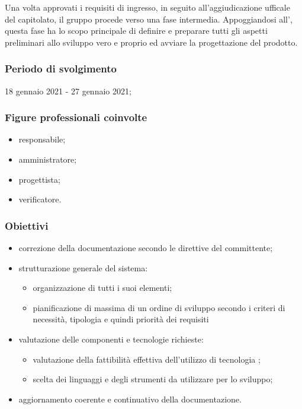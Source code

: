 Una volta approvati i requisiti di ingresso, in seguito all'aggiudicazione ufficale del capitolato, il gruppo procede verso una fase intermedia. Appoggiandosi all'\AdR{}, questa fase ha lo scopo principale di definire e preparare tutti gli aspetti preliminari allo sviluppo vero e proprio ed avviare la progettazione del prodotto.
        
        \subsubsection{Periodo di svolgimento}
        18 gennaio 2021 - 27 gennaio 2021;
        
        \subsubsection{Figure professionali coinvolte}
            \begin{itemize}
                \item responsabile;
                \item amministratore;
                \item progettista;
                \item verificatore.
            \end{itemize}

        \subsubsection{Obiettivi}
        \begin{itemize}
            \item correzione della documentazione secondo le direttive del committente;
            \item strutturazione generale del sistema:
            \begin{itemize}
                \item organizzazione di tutti i suoi elementi;
                \item pianificazione di massima di un ordine di sviluppo secondo i criteri di necessità, tipologia e quindi priorità dei requisiti
            \end{itemize}
            \item valutazione delle componenti e tecnologie richieste:
            \begin{itemize}
                \item valutazione della fattibilità effettiva dell'utilizzo di tecnologia ;
                \item scelta dei linguaggi e degli strumenti da utilizzare per lo sviluppo;
            \end{itemize}
            \item aggiornamento coerente e continuativo della documentazione.
        \end{itemize}